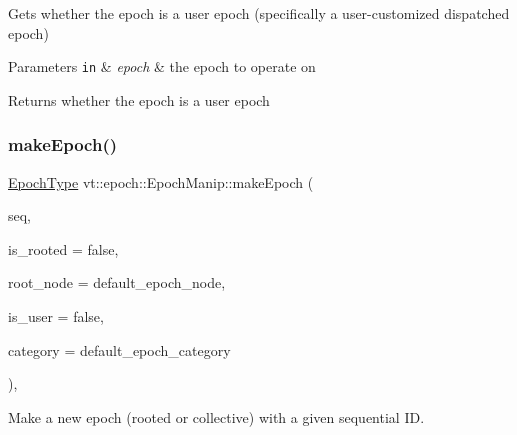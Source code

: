 Gets whether the epoch is a user epoch (specifically a user-\/customized dispatched epoch) 


\begin{DoxyParams}[1]{Parameters}
\mbox{\tt in}  & {\em epoch} & the epoch to operate on\\
\hline
\end{DoxyParams}
\begin{DoxyReturn}{Returns}
whether the {\ttfamily epoch} is a user epoch 
\end{DoxyReturn}
\mbox{\label{structvt_1_1epoch_1_1_epoch_manip_ac8489de69500dee4376806d56850adbc}} 
\subsubsection{\texorpdfstring{make\+Epoch()}{makeEpoch()}}
{\footnotesize\ttfamily \hyperlink{namespacevt_a985a5adf291c34a3ca263b3378388236}{Epoch\+Type} vt\+::epoch\+::\+Epoch\+Manip\+::make\+Epoch (\begin{DoxyParamCaption}\item[{\hyperlink{namespacevt_a985a5adf291c34a3ca263b3378388236}{Epoch\+Type} const \&}]{seq,  }\item[{bool const \&}]{is\+\_\+rooted = {\ttfamily false},  }\item[{\hyperlink{namespacevt_a866da9d0efc19c0a1ce79e9e492f47e2}{Node\+Type} const \&}]{root\+\_\+node = {\ttfamily default\+\_\+epoch\+\_\+node},  }\item[{bool const \&}]{is\+\_\+user = {\ttfamily false},  }\item[{\hyperlink{namespacevt_1_1epoch_a956abe0aceef0d10a988de8acb002c7c}{e\+Epoch\+Category} const \&}]{category = {\ttfamily default\+\_\+epoch\+\_\+category} }\end{DoxyParamCaption})\hspace{0.3cm}{\ttfamily [inline]}, {\ttfamily [static]}}



Make a new epoch (rooted or collective) with a given sequential ID. 


